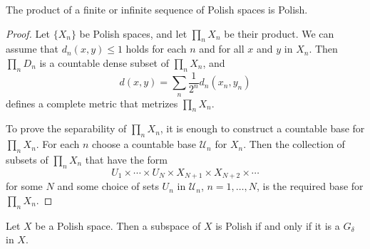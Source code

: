 \begin{proposition}\label{Polish product}
The product of a finite or infinite sequence of Polish spaces is Polish.
\end{proposition}
\begin{proof}
Let $\{X_n\}$ be Polish spaces, and let $\prod_nX_n$ be their product. We can assume that $d_n(x,y)\leq 1$ holds for each $n$ and for all $x$ and $y$ in $X_n$. Then $\prod_nD_n$ is a countable dense subset of $\prod_nX_n$, and
\[d(x,y)=\sum_n\frac{1}{2^n}d_n(x_n,y_n)\]
defines a complete metric that metrizes $\prod_nX_n$.\par
To prove the separability of $\prod_nX_n$, it is enough to construct a countable base for $\prod_nX_n$. For each $n$ choose a countable base $\mathcal{U}_n$ for $X_n$. Then the collection of subsets of $\prod_nX_n$ that have the form
\[U_1\times\cdots\times U_N\times X_{N+1}\times X_{N+2}\times\cdots\]
for some $N$ and some choice of sets $U_n$ in $\mathcal{U}_n$, $n=1,\dots,N$, is the required base for $\prod_nX_n$.
\end{proof}
\begin{proposition}\label{Polish subspace polish iff G_delta}
Let $X$ be a Polish space. Then a subspace of $X$ is Polish if and only if it is a $G_\delta$ in $X$.
\end{proposition}
